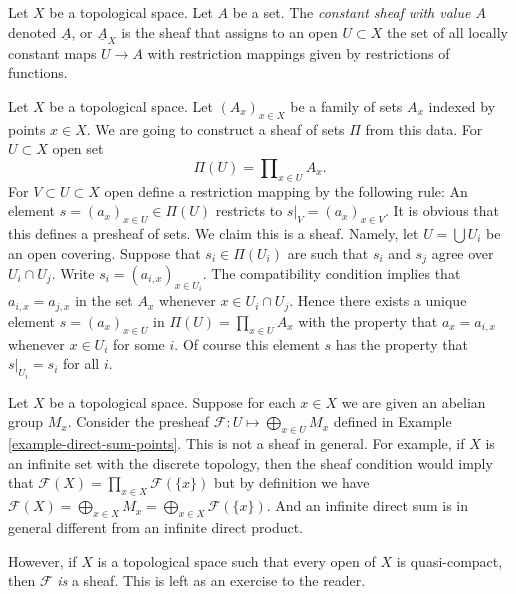 \begin{definition}
\label{definition-constant-sheaf}
Let $X$ be a topological space. Let $A$ be a set.
The {\it constant sheaf with value $A$} denoted $\underline{A}$, or
$\underline{A}_X$ is the sheaf that assigns to an open $U \subset X$
the set of all locally constant maps $U \to A$ with restriction mappings
given by restrictions of functions.
\end{definition}

\begin{example}
\label{example-sheaf-product-pointwise}
Let $X$ be a topological space. Let $(A_x)_{x \in X}$ be
a family of sets $A_x$ indexed by points $x \in X$. We are
going to construct a sheaf of sets $\Pi$ from this data.
For $U \subset X$ open set
$$
\Pi(U) = \prod\nolimits_{x \in U} A_x.
$$
For $V \subset U \subset X$ open define
a restriction mapping by the following rule: An element
$s = (a_x)_{x\in U} \in \Pi(U)$ restricts
to $s|_V = (a_x)_{x \in V}$. It is obvious that this
defines a presheaf of sets. We claim this is a sheaf.
Namely, let $U = \bigcup U_i$ be an open covering.
Suppose that $s_i \in \Pi(U_i)$ are
such that $s_i$ and $s_j$ agree over $U_i \cap U_j$. Write
$s_i = (a_{i, x})_{x\in U_i}$. The compatibility condition implies that
$a_{i, x} = a_{j, x}$ in the set $A_x$ whenever $x \in U_i \cap U_j$.
Hence there exists a unique element $s = (a_x)_{x\in U}$
in $\Pi(U) = \prod_{x\in U} A_x$ with the property that
$a_x = a_{i, x}$ whenever $x \in U_i$ for some $i$. Of course this
element $s$ has the property that $s|_{U_i} = s_i$ for all $i$.
\end{example}

\begin{example}
\label{example-direct-sum-points-not-sheaf}
Let $X$ be a topological space.
Suppose for each $x\in X$ we are given an abelian group $M_x$.
Consider the presheaf $\mathcal{F} : U \mapsto \bigoplus_{x \in U} M_x$
defined in Example \ref{example-direct-sum-points}. This
is not a sheaf in general. For example, if $X$ is an infinite set
with the discrete topology, then the sheaf condition
would imply that $\mathcal{F}(X) = \prod_{x\in X} \mathcal{F}(\{x\})$
but by definition we have $\mathcal{F}(X)
= \bigoplus_{x \in X} M_x = \bigoplus_{x \in X} \mathcal{F}(\{x\})$.
And an infinite direct sum is in general different from an infinite
direct product.

\medskip\noindent
However, if $X$ is a topological space such that every open
of $X$ is quasi-compact, then $\mathcal{F}$ {\it is} a sheaf.
This is left as an exercise to the reader.
\end{example}



